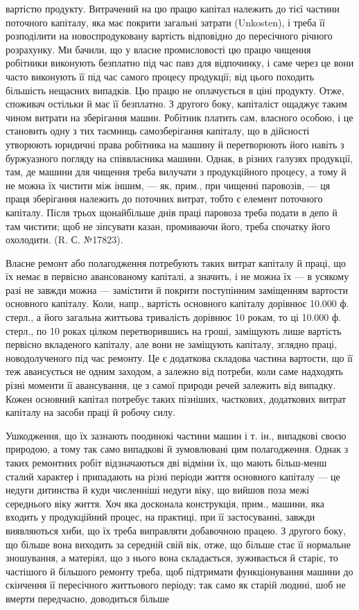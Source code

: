 \parcont{}  %
вартістю продукту. Витрачений на цю працю капітал належить до тієї частини поточного капіталу, яка
має покрити загальні затрати (Unkosten), і треба її розподілити на новоспродуковану вартість
відповідно до пересічного річного розрахунку. Ми бачили, що у власне промисловості цю працю чищення
робітники виконують безплатно під час павз для відпочинку, і саме через це вони часто виконують її
під час самого процесу продукції; від цього походить більшість нещасних випадків. Цю працю
не оплачується в ціні продукту. Отже, споживач остільки й має її безплатно. З другого боку,
капіталіст ощаджує таким чином витрати на зберігання машин. Робітник платить сам, власного особою, і
це становить одну з тих таємниць самозберігання капіталу, що в дійсності утворюють юридичні права
робітника на машину й перетворюють його навіть з буржуазного погляду на співвласника машини. Однак,
в різних галузях продукції, там, де машини для чищення треба вилучати з продукційного процесу, а
тому й не можна їх чистити між іншим, — як, прим., при чищенні паровозів, — ця праця зберігання
належить до поточних витрат, тобто є елемент поточного капіталу. Після трьох щонайбільше днів праці
паровоза треба подати в депо й там чистити; щоб не зіпсувати казан, промиваючи його, треба спочатку
його охолодити. (R. С. №17823).

Власне ремонт або полагодження потребують таких витрат капіталу й праці, що їх немає в первісно
авансованому капіталі, а значить, і не можна їх — в усякому разі не завжди можна — замістити й
покрити поступінним заміщенням вартости основного капіталу. Коли, напр., вартість основного капіталу
дорівнює 10.000 ф. стерл., а його загальна життьова тривалість дорівнює 10 рокам, то ці 10.000 ф.
стерл., по 10 роках цілком перетворившись на гроші, заміщують лише вартість первісно вкладеного
капіталу, але вони не заміщують капіталу, зглядно праці, новодолученого під час ремонту. Це є
додаткова складова частина вартости, що її теж авансується не одним заходом, а залежно від потреби,
коли саме надходять різні моменти її авансування, це з самої природи речей залежить від випадку.
Кожен основний капітал потребує таких пізніших,
часткових, додаткових витрат капіталу на засоби праці й робочу силу.

Ушкодження, що їх зазнають поодинокі частини машин і т. ін., випадкові своєю природою, а тому так
само випадкові й зумовлювані цим полагодження. Однак з таких ремонтних робіт відзначаються дві
відміни їх, що мають більш-менш сталий характер і припадають на різні періоди життя основного
капіталу — це недуги дитинства й куди численніші недуги віку, що вийшов поза межі середнього віку
життя. Хоч яка досконала конструкція, прим., машини, яка входить у продукційний процес, на практиці,
при її застосуванні, завжди виявляються хиби, що їх треба виправляти добавочною працею. З другого
боку, що більше вона виходить за середній свій вік, отже, що більше стає її нормальне зношування, а
матеріял, що з нього вона складається, зуживається й старіє, то частішого й більшого ремонту треба,
щоб підтримати функціонування машини до скінчення її пересічного життьового періоду; так само як
старій людині, шоб не вмерти передчасно, доводиться більше
\parbreak{}  %
